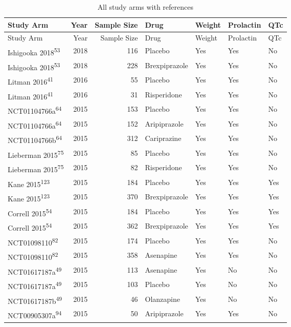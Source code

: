 \documentclass[
  9pt,
  english,
  ,jou,floatsintext]{apa6}
\begin{document}
\begin{longtable}[]{@{}lrrllll@{}}
\caption{\label{tab:unnamed-chunk-1}All study arms with references}\tabularnewline
\toprule
Study Arm & Year & Sample Size & Drug & Weight & Prolactin & QTc \\
\midrule
\endfirsthead
\toprule
Study Arm & Year & Sample Size & Drug & Weight & Prolactin & QTc \\
\midrule
\endhead
Ishigooka 2018\textsuperscript{53} & 2018 & 116 & Placebo & Yes & Yes & No \\
Ishigooka 2018\textsuperscript{53} & 2018 & 228 & Brexpiprazole & Yes & Yes & No \\
Litman 2016\textsuperscript{41} & 2016 & 55 & Placebo & Yes & Yes & No \\
Litman 2016\textsuperscript{41} & 2016 & 31 & Risperidone & Yes & Yes & No \\
NCT01104766a\textsuperscript{64} & 2015 & 153 & Placebo & Yes & Yes & No \\
NCT01104766a\textsuperscript{64} & 2015 & 152 & Aripiprazole & Yes & Yes & No \\
NCT01104766b\textsuperscript{64} & 2015 & 312 & Cariprazine & Yes & Yes & No \\
Lieberman 2015\textsuperscript{75} & 2015 & 85 & Placebo & Yes & Yes & No \\
Lieberman 2015\textsuperscript{75} & 2015 & 82 & Risperidone & Yes & Yes & No \\
Kane 2015\textsuperscript{123} & 2015 & 184 & Placebo & Yes & Yes & Yes \\
Kane 2015\textsuperscript{123} & 2015 & 370 & Brexpiprazole & Yes & Yes & Yes \\
Correll 2015\textsuperscript{54} & 2015 & 184 & Placebo & Yes & Yes & Yes \\
Correll 2015\textsuperscript{54} & 2015 & 362 & Brexpiprazole & Yes & Yes & Yes \\
NCT01098110\textsuperscript{82} & 2015 & 174 & Placebo & Yes & Yes & No \\
NCT01098110\textsuperscript{82} & 2015 & 358 & Asenapine & Yes & Yes & No \\
NCT01617187a\textsuperscript{49} & 2015 & 113 & Asenapine & Yes & No & No \\
NCT01617187a\textsuperscript{49} & 2015 & 103 & Placebo & Yes & No & No \\
NCT01617187b\textsuperscript{49} & 2015 & 46 & Olanzapine & Yes & No & No \\
NCT00905307a\textsuperscript{94} & 2015 & 50 & Aripiprazole & Yes & Yes & No \\

\end{longtable}
\end{document}

